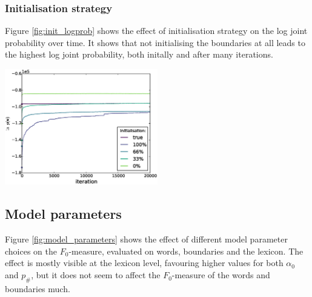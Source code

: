 \subsubsection{Initialisation strategy}

Figure \ref{fig:init_logprob} shows the effect of initialisation strategy on the log joint probability over time. It shows that not initialising the boundaries at all leads to the highest log joint probability, both initally and after many iterations.

\begingroup
    \centering
    \includegraphics[width=0.5\textwidth]{images/initialisation-log_prob}
    \label{fig:init_logprob}
\endgroup

\subsection{Model parameters}

Figure \ref{fig:model_parameters} shows the effect of different model parameter choices on the $F_0$-measure, evaluated on words, boundaries and the lexicon. The effect is mostly visible at the lexicon level, favouring higher values for both $\alpha_0$ and $p_\#$, but it does not seem to affect the $F_0$-measure of the words and boundaries much.

